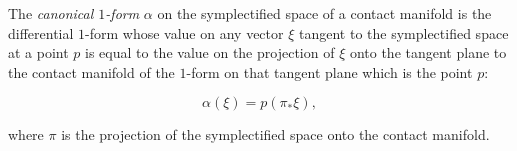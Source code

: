 The \textit{canonical $1$-form} $\alpha$ on the symplectified space of a contact manifold is the differential $1$-form whose value on any vector $\xi$ tangent to the symplectified space at a point $p$ is equal to the value on the projection of $\xi$ onto the tangent plane to the contact manifold of the $1$-form on that tangent plane which is the point $p$:

$$\alpha(\xi) = p(\pi_* \xi),$$

where $\pi$ is the projection of the symplectified space onto the contact manifold.

